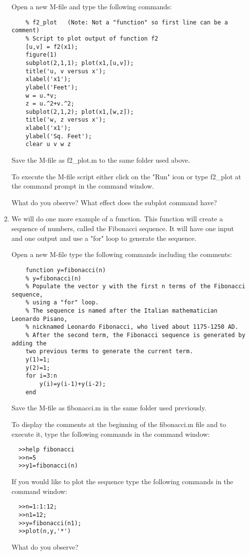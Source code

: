 \begin{enumerate}
  Open a new M-file and type the following commands:
  \begin{verbatim}
    % f2_plot	(Note: Not a "function" so first line can be a comment)
    % Script to plot output of function f2    
    [u,v] = f2(x1);
    figure(1)
    subplot(2,1,1); plot(x1,[u,v]);
    title('u, v versus x');
    xlabel('x1');
    ylabel('Feet');
    w = u.*v;
    z = u.^2+v.^2;
    subplot(2,1,2); plot(x1,[w,z]);
    title('w, z versus x');
    xlabel('x1');
    ylabel('Sq. Feet');
    clear u v w z
  \end{verbatim}
  Save the M-file as f2\_plot.m to the same folder used above.
  
  To execute the M-file script either click on the "Run" icon or type f2\_plot
  at the \ttt{>>} command prompt in the command window.
  
  What do you observe?  What effect does the subplot command have?
  \vspace{.25in}
  
  \item We will do one more example of a function.  This function will create a
  sequence of numbers, called the Fibonacci sequence.  It will have one input
  and one output and use a "for" loop to generate the sequence.

  Open a new M-file type the following commands including the comments:
  \begin{verbatim}
    function y=fibonacci(n)
    % y=fibonacci(n)
    % Populate the vector y with the first n terms of the Fibonacci sequence,
    % using a "for" loop.
    % The sequence is named after the Italian mathematician Leonardo Pisano,
    % nicknamed Leonardo Fibonacci, who lived about 1175-1250 AD.
    % After the second term, the Fibonacci sequence is generated by adding the
    two previous terms to generate the current term.
    y(1)=1;
    y(2)=1;
    for i=3:n
        y(i)=y(i-1)+y(i-2);
    end
  \end{verbatim}
  Save the M-file as fibonacci.m in the same folder used previously.
  
  To display the comments at the beginning of the fibonacci.m file and to
  execute it, type the following commands in the command window:
  \begin{verbatim}
  >>help fibonacci
  >>n=5
  >>y1=fibonacci(n)
  \end{verbatim}
  
  If you would like to plot the sequence type the following commands in the
  command window:
  \begin{verbatim}
  >>n=1:1:12;
  >>n1=12;
  >>y=fibonacci(n1);
  >>plot(n,y,'*')
  \end{verbatim}
  What do you observe?
  
     
\end{enumerate}



